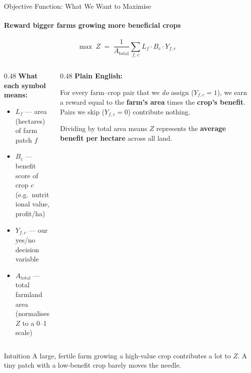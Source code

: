 \begin{frame}{Objective Function: What We Want to Maximise}
    \framesubtitle{Reward bigger farms growing more beneficial crops}

    \begin{equation*}
        \max\; Z \;=\; \frac{1}{A_{\text{total}}}
        \sum_{f,\, c} L_f \cdot B_c \cdot Y_{f,c}
    \end{equation*}

    \vspace{0.4cm}
    \begin{columns}[T]
        \begin{column}{0.48\textwidth}
            \textbf{What each symbol means:}
            \vspace{0.2cm}
            \begin{itemize}
                \item $L_f$ — area (hectares) of farm patch $f$
                \item $B_c$ — benefit score of crop $c$\\
                      {\small (e.g.\ nutritional value, profit/ha)}
                \item $Y_{f,c}$ — our yes/no decision variable
                \item $A_{\text{total}}$ — total farmland area\\
                      {\small (normalises $Z$ to a 0–1 scale)}
            \end{itemize}
        \end{column}
        \begin{column}{0.48\textwidth}
            \textbf{Plain English:}
            \vspace{0.2cm}

            For every farm–crop pair that we \emph{do} assign
            ($Y_{f,c}=1$), we earn a reward equal to the
            \textbf{farm's area} times the \textbf{crop's benefit}.
            Pairs we skip ($Y_{f,c}=0$) contribute nothing.

            \vspace{0.3cm}
            Dividing by total area means $Z$ represents the
            \textbf{average benefit per hectare} across all land.
        \end{column}
    \end{columns}

    \vspace{0.3cm}
    \begin{exampleblock}{Intuition}
        A large, fertile farm growing a high-value crop contributes
        a lot to $Z$. A tiny patch with a low-benefit crop barely moves the needle.
    \end{exampleblock}
\end{frame}

